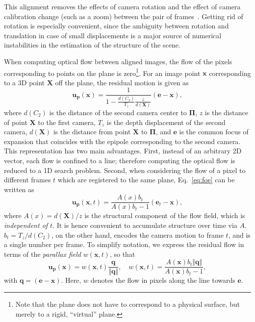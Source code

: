 \documentclass[10pt,twocolumn,letterpaper]{article}
\begin{document}
This alignment removes the effects of camera rotation and the effect of camera calibration change (such as a zoom) between the pair of frames~\cite{Zelnik-Manor:2000:PlanarMotion}.
Getting rid of rotation is especially convenient, since the ambiguity between rotation and translation in case of small displacements is a major source of numerical instabilities in the estimation of the structure of the scene.

When computing optical flow between aligned images, the flow of the pixels corresponding to points on the plane is zero\footnote{Note that the plane does not have to correspond to a physical surface, but merely to a rigid, ``virtual'' plane.}.
For an image point $\mathbf{x}$ corresponding to a 3D point $\mathbf{X}$ off the plane, the residual motion is given as~\cite{Sawhney:1994:3DGeometryPPP}
\begin{equation}
\label{eq:foe}
\mathbf{u_p} \left( \mathbf{x} \right)
=
\frac
{1}
{1 - \frac{d(C_2)}{T_z} \frac{z}{d(\mathbf{X})}}
\left( \mathbf{e} - \mathbf{x} \right), 
\end{equation}
where $d(C_2)$ is the distance of the second camera center to $\mathbf{\Pi}$, $z$ is the distance of point $\mathbf{X}$ to the first camera, $T_z$ is the depth displacement of the second camera, $d(\mathbf{X})$ is the distance from point $\mathbf{X}$ to $\mathbf{\Pi}$, and $\mathbf{e}$ is the common focus of expansion that coincides with the epipole corresponding to the second camera.
This representation has two main advantages.
First, instead of an arbitrary 2D vector, each flow is confined to a line; therefore computing the optical flow is reduced to a 1D search problem.
Second, when considering the flow of a pixel to different frames $t$ which are registered to the same plane,
Eq.~\eqref{eq:foe} can be written as
\begin{equation}
\label{eq:foeredux}
\mathbf{u_p} \left( \mathbf{x}, t \right)
=
\frac
{A(x) b_t}
{A(x) b_t - 1}
\left( \mathbf{e}_t - \mathbf{x} \right),
\end{equation}
where $A(x) = d(\mathbf{X})/z$ is the structural component of the flow field, which is \textit{independent of $t$}.
It is hence convenient to accumulate structure over time via $A$.
$b_t = T_z / d(C_2)$, on the other hand, encodes the camera motion to frame $t$, and is a single number per frame.
To simplify notation, we express the residual flow in terms of the \textit{parallax field} $w(\mathbf{x}, t)$, so that
\begin{equation}
\label{eq:parallax}
\mathbf{u_p} \left( \mathbf{x} \right)
=
w \left( \mathbf{x}, t \right) \frac{ \mathbf{q} }{ \Vert \mathbf{q} \Vert }, \quad
w \left( \mathbf{x}, t \right) =
\frac{ A(\mathbf{x}) b_t \Vert \mathbf{q} \Vert }
{A(\mathbf{x}) b_t - 1}, 
\end{equation}
with $\mathbf{q} = \left( \mathbf{e} - \mathbf{x} \right)$. Here, $w$ denotes the flow in pixels along the line towards $\mathbf{e}$.
\end{document}
